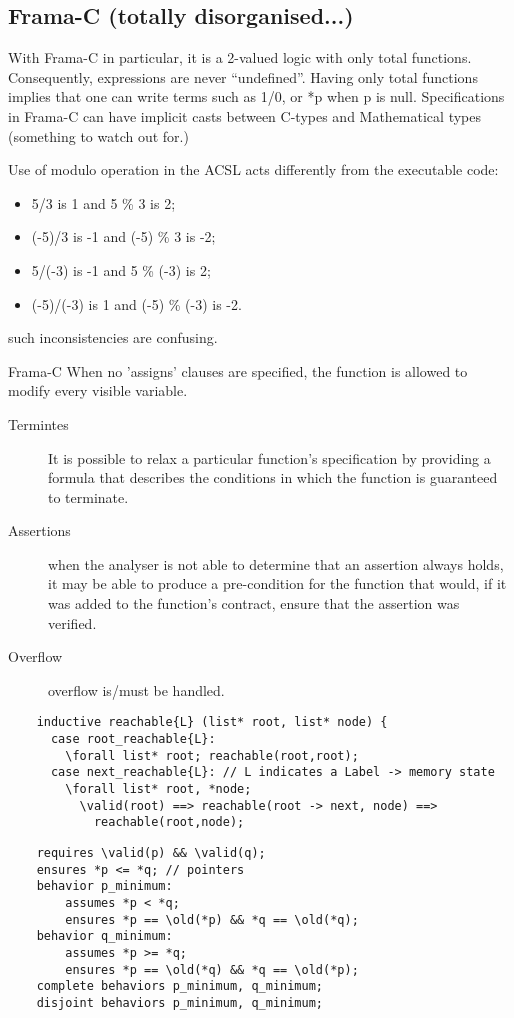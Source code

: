 \documentclass[10pt]{article} %
\begin{document}
\subsection{Frama-C (totally disorganised...)}
With Frama-C in particular, it is a 2-valued logic with only total functions. Consequently, expressions are never “undefined”. Having only total functions implies that one can write terms such as 1\slash 0, or *p when p is null.
Specifications in Frama-C can have implicit casts between C-types and Mathematical types (something to watch out for.)

Use of modulo operation in the ACSL acts differently from the executable code:
\begin{itemize}
\item 5\slash 3 is 1 and 5 \% 3 is 2;
\item (-5)\slash 3 is -1 and (-5) \% 3 is -2;
\item 5\slash (-3) is -1 and 5 \% (-3) is 2;
\item (-5)\slash (-3) is 1 and (-5) \% (-3) is -2.
\end{itemize} such inconsistencies are confusing.

Frama-C When no 'assigns' clauses are specified, the function is allowed to modify every visible variable.
\begin{description}
\item[Termintes]It is possible to relax a particular function’s specification by providing a formula that describes the conditions in which the function is guaranteed to terminate. 
\item[Assertions]when the analyser is not able to determine that an assertion always holds, it may be able to produce a pre-condition for the function that would, if it was added to the function’s contract, ensure that the assertion was verified. 
\item[Overflow] overflow is\slash must be handled.
\end{description}


\begin{lstlisting}
	inductive reachable{L} (list* root, list* node) {
	  case root_reachable{L}:
	    \forall list* root; reachable(root,root);
	  case next_reachable{L}: // L indicates a Label -> memory state
	    \forall list* root, *node;
	      \valid(root) ==> reachable(root -> next, node) ==>
	        reachable(root,node);
\end{lstlisting}
\begin{lstlisting}
	requires \valid(p) && \valid(q);
	ensures *p <= *q; // pointers
	behavior p_minimum:
		assumes *p < *q;
		ensures *p == \old(*p) && *q == \old(*q);
	behavior q_minimum:
		assumes *p >= *q;
		ensures *p == \old(*q) && *q == \old(*p);
	complete behaviors p_minimum, q_minimum;
	disjoint behaviors p_minimum, q_minimum;
\end{lstlisting}
\end{document}
